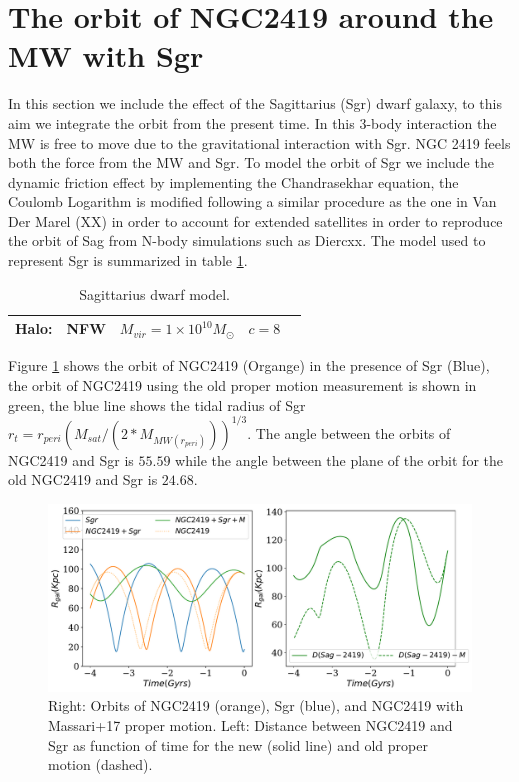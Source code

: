 \documentclass[14pt]{article}
\begin{document}
\section{The orbit of NGC2419 around the MW with Sgr}\label{sec:NGCSgr}

In this section we include the effect of the Sagittarius (Sgr) dwarf
galaxy, to this aim we integrate the orbit from the present time. In
this 3-body interaction the MW is free to move due to the
gravitational interaction with Sgr. NGC 2419 feels both the force
from the MW and Sgr. To model the orbit of Sgr we include the dynamic
friction effect by implementing the Chandrasekhar equation, the
Coulomb Logarithm is modified following a similar procedure as the one
in Van Der Marel (XX) in order to account for extended satellites in 
order to reproduce the orbit of Sag from N-body simulations such as 
Diercxx. The model used to represent Sgr is summarized in table
\ref{tab:Sgrmodel}.


\begin{table}[H]
\centering
\begin{tabular}{c c c c c}
\hline
\hline
Halo: & NFW & $M_{vir} = 1\times 10^{10} M_{\odot}$ & $c=8$  \\
\hline
\hline
\end{tabular}
\caption{Sagittarius dwarf model.\label{tab:Sgrmodel}}
\end{table}


Figure \ref{fig:Sgrmodel1} shows the orbit of NGC2419 (Organge) in the
presence of Sgr (Blue), the orbit of NGC2419 using the old proper
motion measurement is shown in green, the blue line shows the tidal
radius of Sgr $r_t = r_{peri} (M_{sat}/(2*M_{MW(r_{peri})}))^{1/3}$.
The angle between the orbits of NGC2419 and Sgr is $55.59$ while the
angle between the plane of the orbit for the old NGC2419  and Sgr is
$24.68$.

\begin{figure}[H]
\centering
\includegraphics[scale=0.5]{../exploratory_code/NGC2419_sphMWSGR.pdf}
\caption{Right: Orbits of NGC2419 (orange), Sgr (blue), and NGC2419
with Massari+17 proper motion. Left: Distance between NGC2419 and Sgr
as function of time for the new (solid line) and old proper motion
(dashed). \label{fig:Sgrmodel1}}
\end{figure}
\end{document}
